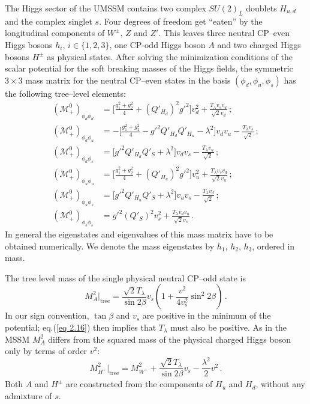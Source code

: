 \documentclass[a4paper,11pt]{article}
\begin{document}
The Higgs sector of the UMSSM contains two complex $SU(2)_{L}$ doublets
$H_{u,d}$ and the complex singlet $s$. Four degrees of freedom get
``eaten'' by the longitudinal components of $W^\pm, \, Z$ and
$Z'$. This leaves three neutral CP--even Higgs bosons
$h_{i},\, i\in \{1,2,3 \}$, one CP-odd Higgs boson $A$ and two charged
Higgs bosons $H^{\pm}$ as physical states. After solving the
minimization conditions of the scalar potential for the soft breaking
masses of the Higgs fields, the symmetric $3 \times 3$ mass matrix for
the neutral CP--even states in the basis $(\phi_d,\phi_u,\phi_s)$ has
the following tree--level elements:
%
\begin{subequations} \label{eq:subeqns}
\begin{align}
\left( \mathcal{M}_+^0 \right)_{\phi_d \phi_d} &= \Big[ \frac{g_1^2 + g_2^2} {4}
+ (Q'_{H_d})^2 g'^2 \Big] v_d^2 + \frac{T_\lambda v_s v_u} {\sqrt{2} v_d} \,;
\label{eq 2.14a} \\  
%
\left( \mathcal{M}_+^0 \right)_{\phi_d \phi_u} &= -\Big[ \frac{g_1^2 +g_2^2} {4}
- g'^2 Q'_{H_d} Q'_{H_u} - \lambda^2\Big] v_dv_u - \frac{T_\lambda v_s} 
{\sqrt{2}}\,;
\label{eq 2.14b} \\
%
\left( \mathcal{M}_+^0 \right)_{\phi_d \phi_s} &= \Big[ g'^2 Q'_{H_d} Q'_S
+ \lambda^2\Big] v_d v_s - \frac{T_\lambda v_u} {\sqrt{2}}\,;
\label{eq 2.14c} \\
%
\left( \mathcal{M}_+^0 \right)_{\phi_u \phi_u} &= \Big[ \frac{g_1^2 +g_2^2} {4}
+ (Q'_{H_u})^2g'^2\Big] v_u^2 + \frac{T_\lambda v_s v_d} {\sqrt{2}v_u}\,;
\label{eq 2.14d}   \\
%
\left( \mathcal{M}_+^0 \right)_{\phi_u \phi_s} &= \Big[ g'^2 Q'_{H_u} Q'_S
+ \lambda^2 \Big] v_u v_s - \frac{ T_\lambda v_d} {\sqrt{2}}\,;
\label{eq 2.14e}   \\
%
\left( \mathcal{M}_+^0 \right)_{\phi_s \phi_s} &= g'^2 (Q'_S)^2 v_s^2 
+ \frac {T_\lambda v_d v_u }{ \sqrt{2} v_s }\,.  \label{eq 2.14f}
\end{align}
\end{subequations}
%
In general the eigenstates and eigenvalues of this mass matrix have to
be obtained numerically. We denote the mass eigenstates by
$h_{1},\,h_{2},\,h_{3}$, ordered in mass.

The tree level mass of the single physical neutral CP--odd state is
%
\begin{equation} \label{eq 2.16}
M_A^2|_{\text{tree}} = \frac {\sqrt{2} T_\lambda} {\sin{2\beta}} v_s 
\left( 1 + \frac {v^2} {4v_s^2} \sin^2{2\beta} \right)\,. 
\end{equation}
%
In our sign convention, $\tan\beta$ and $v_s$ are positive in the
minimum of the potential; eq.(\ref{eq 2.16}) then implies that
$T_\lambda$ must also be positive. As in the MSSM $M_A^2$ differs from
the squared mass of the physical charged Higgs boson only by terms of
order $v^2$:
%
\begin{equation} \label{eq 2.17}
M_{H^+}^2|_{\text{tree}} = M_{W^+}^2 + \frac{\sqrt{2} T_\lambda} {\sin{2\beta}} v_s
- \frac {\lambda^2} {2} v^2\,. 
\end{equation}
%
Both $A$ and $H^\pm$ are constructed from the components of $H_u$ and $H_d$,
without any admixture of $s$.
\end{document}
